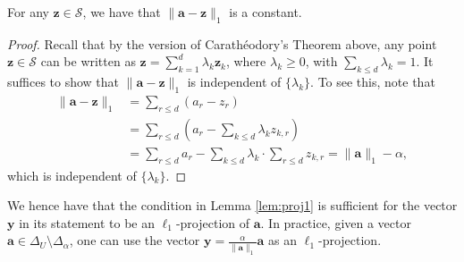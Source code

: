 \begin{proposition}
	\label{prop:proj1}
	For any $\mathbf{z}\in \mathcal{S}$, we have that $\lVert \mathbf{a} - \mathbf{z}\rVert_1$ is a constant.
\end{proposition}
\begin{proof}
	Recall that by the version of Carath\'eodory's Theorem above, any point $\mathbf{z}\in \mathcal{S}$ can be written as $\mathbf{z} = \sum_{k=1}^d \lambda_k \mathbf{z}_k$, where $\lambda_k\geq 0$, with $\sum_{k\leq d} \lambda_k = 1$.  It suffices to show that $\lVert \mathbf{a} - \mathbf{z}\rVert_1$ is independent of $\{\lambda_k\}$. To see this, note that
	\begin{align*}
		\lVert \mathbf{a} - \mathbf{z}\rVert_1&= \sum_{r\leq d} (a_r-z_r)\\
		&=\sum_{r\leq d} (a_r-\sum_{k\leq d} \lambda_k z_{k,r})\\
		&= \sum_{r\leq d} a_r - \sum_{k\leq d} \lambda_k\cdot \sum_{r\leq d} z_{k,r} = \lVert \mathbf{a}\rVert_1 - \alpha,
	\end{align*}
which is independent of $\{\lambda_k\}$.
\end{proof}
We hence have that the condition in Lemma \ref{lem:proj1} is sufficient for the vector $\mathbf{y}$ in its statement to be an $\ell_1$-projection of $\mathbf{a}$. In practice, given a vector $\mathbf{a}\in \Delta_U\setminus \Delta_\alpha$, one can use the vector $\mathbf{y} = \frac{\alpha}{\lVert \mathbf{a}\rVert_1} \mathbf{a}$ as an $\ell_1$-projection.
